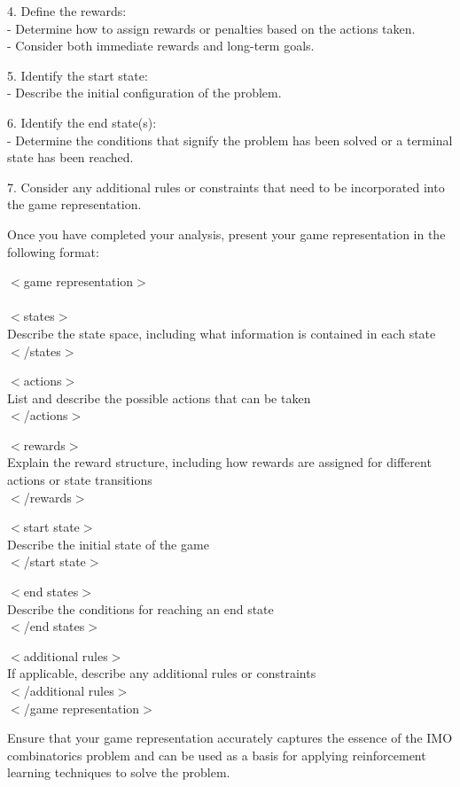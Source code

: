 \begin{tcolorbox}[enhanced, breakable, rounded corners, 
    colback=brown!5!white, colframe=brown!75!black,
    colbacktitle=brown!85!black, fonttitle=\bfseries, coltitle=white,
    title= Game Representation Prompt]
4. Define the rewards: \\
   - Determine how to assign rewards or penalties based on the actions taken. \\
   - Consider both immediate rewards and long-term goals.

5. Identify the start state: \\
   - Describe the initial configuration of the problem. 

6. Identify the end state(s): \\
   - Determine the conditions that signify the problem has been solved or a terminal state has been reached.  

7. Consider any additional rules or constraints that need to be incorporated into the game representation.

Once you have completed your analysis, present your game representation in the following format:

$<$game representation$>$\\
\\
$<$states$>$\\
Describe the state space, including what information is contained in each state\\
$<$/states$>$

$<$actions$>$ \\
List and describe the possible actions that can be taken\\
$<$/actions$>$

$<$rewards$>$ \\
Explain the reward structure, including how rewards are assigned for different actions or state transitions\\
$<$/rewards$>$

$<$start state$>$ \\
Describe the initial state of the game \\
$<$/start state$>$

$<$end states$>$ \\
Describe the conditions for reaching an end state\\
$<$/end states$>$

$<$additional rules$>$ \\
If applicable, describe any additional rules or constraints\\
$<$/additional rules$>$\\
$<$/game representation$>$

Ensure that your game representation accurately captures the essence of the IMO combinatorics problem and can be used as a basis for applying reinforcement learning techniques to solve the problem.
\end{tcolorbox}

